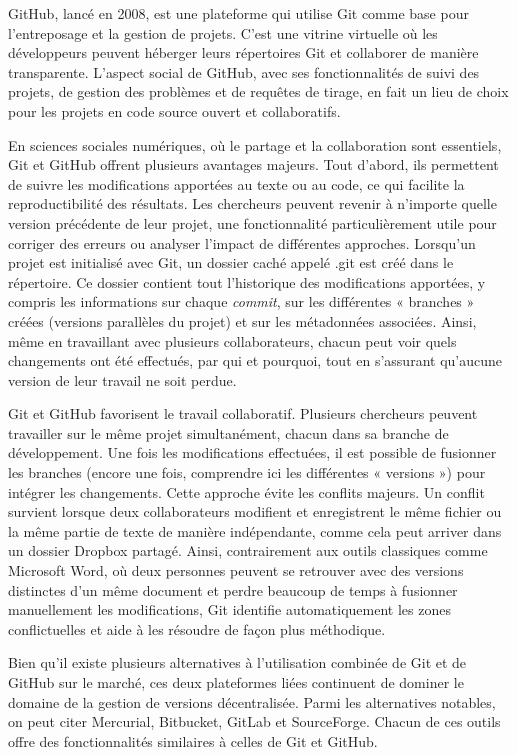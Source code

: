 \documentclass[
  letterpaper,
  DIV=11,
  numbers=noendperiod]{scrreprt}
\begin{document}
GitHub, lancé en 2008, est une plateforme qui utilise Git comme base
pour l'entreposage et la gestion de projets. C'est une vitrine virtuelle
où les développeurs peuvent héberger leurs répertoires Git et collaborer
de manière transparente. L'aspect social de GitHub, avec ses
fonctionnalités de suivi des projets, de gestion des problèmes et de
requêtes de tirage, en fait un lieu de choix pour les projets en code
source ouvert et collaboratifs.

En sciences sociales numériques, où le partage et la collaboration sont
essentiels, Git et GitHub offrent plusieurs avantages majeurs. Tout
d'abord, ils permettent de suivre les modifications apportées au texte
ou au code, ce qui facilite la reproductibilité des résultats. Les
chercheurs peuvent revenir à n'importe quelle version précédente de leur
projet, une fonctionnalité particulièrement utile pour corriger des
erreurs ou analyser l'impact de différentes approches. Lorsqu'un projet
est initialisé avec Git, un dossier caché appelé .git est créé dans le
répertoire. Ce dossier contient tout l'historique des modifications
apportées, y compris les informations sur chaque \emph{commit}, sur les
différentes « branches » créées (versions parallèles du projet) et sur
les métadonnées associées. Ainsi, même en travaillant avec plusieurs
collaborateurs, chacun peut voir quels changements ont été effectués,
par qui et pourquoi, tout en s'assurant qu'aucune version de leur
travail ne soit perdue.

Git et GitHub favorisent le travail collaboratif. Plusieurs chercheurs
peuvent travailler sur le même projet simultanément, chacun dans sa
branche de développement. Une fois les modifications effectuées, il est
possible de fusionner les branches (encore une fois, comprendre ici les
différentes « versions ») pour intégrer les changements. Cette approche
évite les conflits majeurs. Un conflit survient lorsque deux
collaborateurs modifient et enregistrent le même fichier ou la même
partie de texte de manière indépendante, comme cela peut arriver dans un
dossier Dropbox partagé. Ainsi, contrairement aux outils classiques
comme Microsoft Word, où deux personnes peuvent se retrouver avec des
versions distinctes d'un même document et perdre beaucoup de temps à
fusionner manuellement les modifications, Git identifie automatiquement
les zones conflictuelles et aide à les résoudre de façon plus
méthodique.

Bien qu'il existe plusieurs alternatives à l'utilisation combinée de Git
et de GitHub sur le marché, ces deux plateformes liées continuent de
dominer le domaine de la gestion de versions décentralisée. Parmi les
alternatives notables, on peut citer Mercurial, Bitbucket, GitLab et
SourceForge. Chacun de ces outils offre des fonctionnalités similaires à
celles de Git et GitHub.
\end{document}
